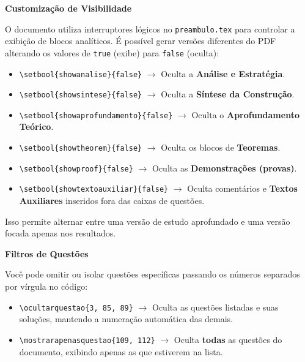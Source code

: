 \documentclass[10pt,a4paper]{article}
\begin{document}
	\begin{tcolorbox}[
		enhanced, 
		sharp corners, 
		boxrule=0.5pt, 
		colback=white, 
		colframe=gray!40, %
		left=10pt, right=10pt, top=10pt, bottom=10pt
		]
		\textbf{Customização de Visibilidade}
		
		\vspace{0.2cm}
		O documento utiliza interruptores lógicos no \texttt{preambulo.tex} para controlar a exibição de blocos analíticos. É possível gerar versões diferentes do PDF alterando os valores de \texttt{true} (exibe) para \texttt{false} (oculta):
		\begin{itemize}
			\item \texttt{\textbackslash setbool\{showanalise\}\{false\}} $\longrightarrow$ Oculta a \textbf{Análise e Estratégia}.
			\item \texttt{\textbackslash setbool\{showsintese\}\{false\}} $\longrightarrow$ Oculta a \textbf{Síntese da Construção}.
			\item \texttt{\textbackslash setbool\{showaprofundamento\}\{false\}} $\longrightarrow$ Oculta o \textbf{Aprofundamento Teórico}.
			\item \texttt{\textbackslash setbool\{showtheorem\}\{false\}} $\longrightarrow$ Oculta os blocos de \textbf{Teoremas}.
			\item \texttt{\textbackslash setbool\{showproof\}\{false\}} $\longrightarrow$ Oculta as \textbf{Demonstrações (provas)}.
			\item \texttt{\textbackslash setbool\{showtextoauxiliar\}\{false\}} $\longrightarrow$ Oculta comentários e \textbf{Textos Auxiliares} inseridos fora das caixas de questões.
		\end{itemize}
		Isso permite alternar entre uma versão de estudo aprofundado e uma versão focada apenas nos resultados.
	\end{tcolorbox}
	
	\begin{tcolorbox}[
		enhanced, 
		sharp corners, 
		boxrule=0.5pt, 
		colback=white, 
		colframe=gray!40, %
		left=10pt, right=10pt, top=10pt, bottom=10pt
		]
		\textbf{Filtros de Questões}
		
		\vspace{0.2cm}
		Você pode omitir ou isolar questões específicas passando os números separados por vírgula no código:
		\begin{itemize}
			\item \texttt{\textbackslash ocultarquestao\{3, 85, 89\}} $\longrightarrow$ Oculta as questões listadas e suas soluções, mantendo a numeração automática das demais.
			\item \texttt{\textbackslash mostrarapenasquestao\{109, 112\}} $\longrightarrow$ Oculta \textbf{todas} as questões do documento, exibindo apenas as que estiverem na lista.
		\end{itemize}
	\end{tcolorbox}
	
\end{document}

